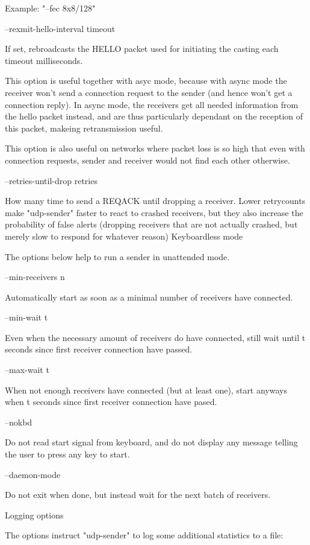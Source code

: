 Example: "--fec 8x8/128" 

--rexmit-hello-interval timeout

    If set, rebroadcasts the HELLO packet used for initiating the casting
each timeout milliseconds.

    This option is useful together with asyc mode, because with async mode
the receiver won't send a connection request to the sender (and hence won't
get a connection reply). In async mode, the receivers get all needed
information from the hello packet instead, and are thus particularly
dependant on the reception of this packet, makeing retransmission useful.

    This option is also useful on networks where packet loss is so high
that even with connection requests, sender and receiver would not find each
other otherwise. 

--retries-until-drop retries

    How many time to send a REQACK until dropping a receiver. Lower
retrycounts make "udp-sender" faster to react to crashed receivers, but
they also increase the probability of false alerts (dropping receivers that
are not actually crashed, but merely slow to respond for whatever reason) 
Keyboardless mode

The options below help to run a sender in unattended mode.

--min-receivers n

    Automatically start as soon as a minimal number of receivers have
connected. 

--min-wait t

    Even when the necessary amount of receivers do have connected, still
wait until t seconds since first receiver connection have passed. 

--max-wait t

    When not enough receivers have connected (but at least one), start
anyways when t seconds since first receiver connection have pased. 

--nokbd

    Do not read start signal from keyboard, and do not display any message
telling the user to press any key to start. 

--daemon-mode

    Do not exit when done, but instead wait for the next batch of
receivers.

Logging options

The options instruct "udp-sender" to log some additional statistics to a
file:

